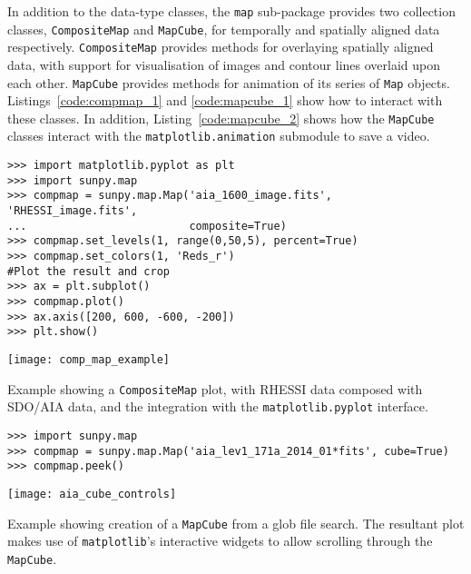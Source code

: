 In addition to the data-type classes, the \texttt{map} sub-package provides two 
collection classes, \texttt{CompositeMap} and \texttt{MapCube}, for 
temporally and spatially aligned data respectively.
\texttt{CompositeMap} provides methods for overlaying spatially aligned 
data, with support for visualisation of images and contour lines overlaid 
upon each other.
\texttt{MapCube} 
provides methods for animation of its series of \texttt{Map} objects. 
Listings~\ref{code:compmap_1} and \ref{code:mapcube_1} show how to interact 
with these classes.
In addition, Listing~\ref{code:mapcube_2} shows how the \texttt{MapCube} 
classes interact with the \texttt{matplotlib.animation} submodule to save a 
video.

\begin{listing}[H]
\begin{verbatim}
>>> import matplotlib.pyplot as plt
>>> import sunpy.map
>>> compmap = sunpy.map.Map('aia_1600_image.fits', 'RHESSI_image.fits', 
...                         composite=True)
>>> compmap.set_levels(1, range(0,50,5), percent=True)
>>> compmap.set_colors(1, 'Reds_r')
#Plot the result and crop
>>> ax = plt.subplot()
>>> compmap.plot()
>>> ax.axis([200, 600, -600, -200])
>>> plt.show()
\end{verbatim}
\begin{center}
\texttt{[image: comp\_map\_example]}
\end{center}
\caption{Example showing a \texttt{CompositeMap} plot, with RHESSI data composed with SDO/AIA data, and the integration with the \texttt{matplotlib.pyplot} interface.}
\label{code:compmap_1}
\end{listing}

\begin{listing}[H]
\begin{verbatim}
>>> import sunpy.map
>>> compmap = sunpy.map.Map('aia_lev1_171a_2014_01*fits', cube=True)
>>> compmap.peek()
\end{verbatim}
\begin{center}
\texttt{[image: aia\_cube\_controls]}
\end{center}
\caption{Example showing creation of a \texttt{MapCube} from a glob file search. The 
resultant plot makes use of \texttt{matplotlib}'s interactive widgets to allow scrolling 
through the \texttt{MapCube}.}
\label{code:mapcube_1}
\end{listing}

